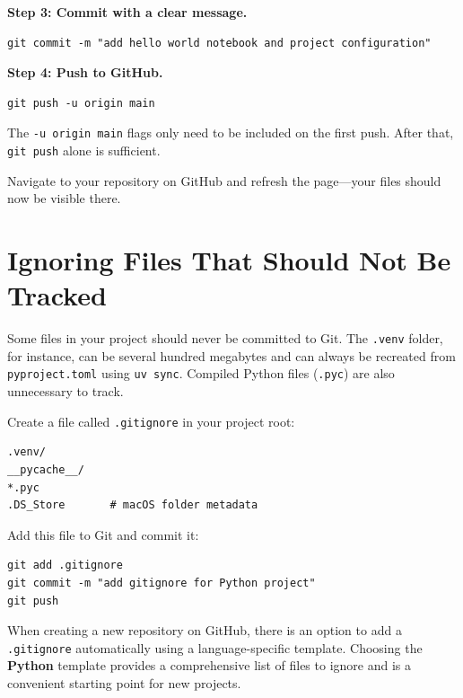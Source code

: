 \documentclass[nobib]{tufte-book}
\begin{document}
\medskip
\noindent\textbf{Step 3: Commit with a clear message.}

\begin{lstlisting}[style=bashstyle]
git commit -m "add hello world notebook and project configuration"
\end{lstlisting}

\medskip
\noindent\textbf{Step 4: Push to GitHub.}

\begin{lstlisting}[style=bashstyle]
git push -u origin main
\end{lstlisting}

The \texttt{-u origin main} flags only need to be included on the first push.
After that, \texttt{git push} alone is sufficient.

Navigate to your repository on GitHub and refresh the page---your files
should now be visible there.

\section{Ignoring Files That Should Not Be Tracked}

Some files in your project should never be committed to Git.
The \texttt{.venv} folder, for instance, can be several hundred megabytes
and can always be recreated from \texttt{pyproject.toml} using
\texttt{uv sync}.
Compiled Python files (\texttt{.pyc}) are also unnecessary to track.

Create a file called \texttt{.gitignore} in your project root:

\begin{lstlisting}[style=bashstyle]
.venv/
__pycache__/
*.pyc
.DS_Store       # macOS folder metadata
\end{lstlisting}

Add this file to Git and commit it:

\begin{lstlisting}[style=bashstyle]
git add .gitignore
git commit -m "add gitignore for Python project"
git push
\end{lstlisting}

\begin{notebox}[title={GitHub's Python Template}]
When creating a new repository on GitHub, there is an option to add a
\texttt{.gitignore} automatically using a language-specific template.
Choosing the \textbf{Python} template provides a comprehensive list of
files to ignore and is a convenient starting point for new projects.
\end{notebox}
\end{document}
